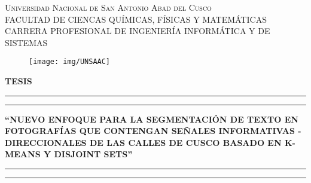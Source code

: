 \documentclass[12pt,oneside,a4paper]{book}
\theoremstyle{definition}
\begin{document}
\frontmatter 
\fancyhead[RO]{{\footnotesize\rightmark}\hspace{2em}\thepage}
\setcounter{tocdepth}{4}
\setcounter{secnumdepth}{4}
\fancyhead[LE]{\thepage\hspace{2em}\footnotesize{\leftmark}}
\fancyhead[RE,LO]{}
\fancyhead[RO]{{\footnotesize\rightmark}\hspace{2em}\thepage}
\onehalfspacing  %

\thispagestyle{empty}

\begin{center}

\textsc{\large Universidad Nacional de San Antonio Abad del Cusco}\\\vspace*{0.04in}
\textsc{FACULTAD DE CIENCAS QUÍMICAS, FÍSICAS Y MATEMÁTICAS}\\
\vspace*{0.04in}
CARRERA PROFESIONAL DE INGENIERÍA INFORMÁTICA Y DE SISTEMAS \\

\captionsetup[figure]{labelformat=empty}
\begin{figure}[htb]
\begin{center}
\texttt{[image: img/UNSAAC]}
\caption[]{}
\end{center}
\end{figure}

\newcommand{\topline}{
  \rule{164mm}{2mm}
  \vspace*{-0.23in}
  \hrule  
}
\newcommand{\downline}{
  \hrule  
  \vspace*{0.02in}
  \rule{164mm}{2mm}
}

\vspace*{-0.6in}
\textbf{TESIS}\\
\topline
\vspace*{0.1in}
\begin{large}
\textbf{``NUEVO ENFOQUE PARA LA SEGMENTACIÓN DE TEXTO EN FOTOGRAFÍAS QUE CONTENGAN SEÑALES INFORMATIVAS - DIRECCIONALES DE LAS CALLES DE CUSCO BASADO EN K-MEANS Y DISJOINT SETS''} \\
\end{large}
\vspace*{0.08in}
\downline
\vspace*{0.25in}


\end{center}
\end{document}
